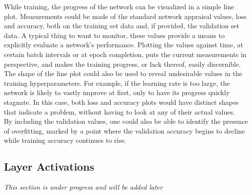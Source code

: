 While training, the progress of the network can be visualized in a simple line plot. Measurements could be made of the standard network appraisal values, loss and accuracy, both on the training set data and, if provided, the validation set data. A typical thing to want to monitor, these values provide a means to explicitly evaluate a network's performance. Plotting the values against time, at certain batch intervals or at epoch completion, puts the current measurements in perspective, and makes the training progress, or lack thereof, easily discernible. The shape of the line plot could also be used to reveal undesirable values in the training hyperparameters. For example, if the learning rate is too large, the network is likely to vastly improve at first, only to have its progress quickly stagnate. In this case, both loss and accuracy plots would have distinct shapes that indicate a problem, without having to look at any of their actual values. \\

\noindent By including the validation values, one could also be able to identify the presence of overfitting, marked by a point where the validation accuracy begins to decline while training accuracy continues to rise.

\subsection{Layer Activations}

\textit{This section is under progress and will be added later}

